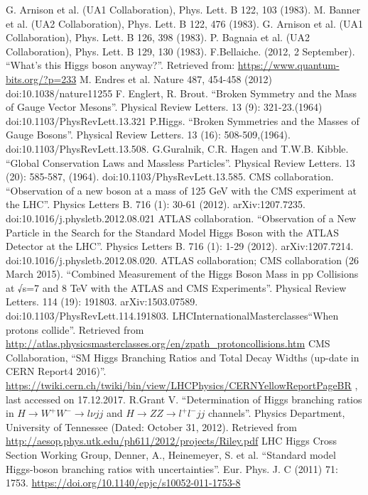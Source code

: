 \documentclass[print]{nuthesis}
\begin{document}
\begin{thebibliography}{300}
G. Arnison et al. (UA1 Collaboration), Phys. Lett. B 122, 103 (1983).
 M. Banner et al. (UA2 Collaboration), Phys. Lett. B 122, 476 (1983).
G. Arnison et al. (UA1 Collaboration), Phys. Lett. B 126, 398 (1983).
P. Bagnaia et al. (UA2 Collaboration), Phys. Lett. B 129, 130 (1983).
 F.Bellaiche. (2012, 2 September). ``What's this Higgs boson anyway?''. Retrieved from: \url{https://www.quantum-bits.org/?p=233} 
 M. Endres et al. Nature 487, 454-458 (2012) doi:10.1038/nature11255
 F. Englert, R. Brout. ``Broken Symmetry and the Mass of Gauge Vector Mesons''. Physical Review Letters. 13 (9): 321-23.(1964) doi:10.1103/PhysRevLett.13.321
 P.Higgs. ``Broken Symmetries and the Masses of Gauge Bosons''. Physical Review Letters. 13 (16): 508-509,(1964). doi:10.1103/PhysRevLett.13.508.
 G.Guralnik, C.R. Hagen  and T.W.B. Kibble. ``Global Conservation Laws and Massless Particles''. Physical Review Letters. 13 (20): 585-587, (1964). doi:10.1103/PhysRevLett.13.585.
 CMS collaboration. ``Observation of a new boson at a mass of 125 GeV with the CMS experiment at the LHC''. Physics Letters B. 716 (1): 30-61 (2012). arXiv:1207.7235. doi:10.1016/j.physletb.2012.08.021
 ATLAS collaboration. ``Observation of a New Particle in the Search for the Standard Model Higgs Boson with the ATLAS Detector at the LHC''. Physics Letters B. 716 (1): 1-29 (2012). arXiv:1207.7214.  doi:10.1016/j.physletb.2012.08.020.
 ATLAS collaboration; CMS collaboration (26 March 2015). ``Combined Measurement of the Higgs Boson Mass in pp Collisions at √s=7 and 8 TeV with the ATLAS and CMS Experiments''. Physical Review Letters. 114 (19): 191803. arXiv:1503.07589. doi:10.1103/PhysRevLett.114.191803.
 LHC\@ InternationalMasterclasses``When protons collide''. Retrieved from \url{http://atlas.physicsmasterclasses.org/en/zpath\_protoncollisions.htm}
 CMS Collaboration, ``SM Higgs Branching Ratios and Total Decay Widths (up-date in CERN Report4 2016)''. \url{https://twiki.cern.ch/twiki/bin/view/LHCPhysics/CERNYellowReportPageBR} , last accessed on 17.12.2017.
 R.Grant V. ``Determination of Higgs branching ratios in $H\to W^+W^-\to l\nu jj$ and $H\to ZZ \to l^+l^-jj$ channels''. Physics Department, University of Tennessee (Dated: October 31, 2012). Retrieved from \url{http://aesop.phys.utk.edu/ph611/2012/projects/Riley.pdf}
 LHC Higgs Cross Section Working Group, Denner, A., Heinemeyer, S. et al. ``Standard model Higgs-boson branching ratios with uncertainties''. Eur. Phys. J. C (2011) 71: 1753. \url{https://doi.org/10.1140/epjc/s10052-011-1753-8}

\end{thebibliography}
\end{document}
